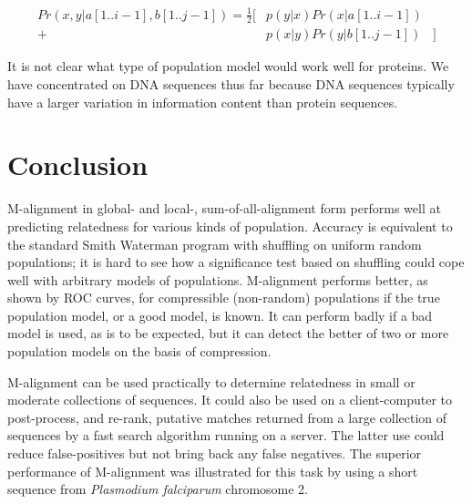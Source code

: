 \documentclass[letterpaper,11pt,oneside]{article}
\begin{document}
\begin{multicols}{2}
{
\small
\setlength{\arraycolsep}{0pt}
\begin{eqnarray*}
Pr(x,y | a[1..i-1],b[1..j-1] ) = \frac{1}{2}
[ & p(y|x) Pr(x | a[1..i-1]) & \\
+ & p(x|y) Pr(y | b[1..j-1]) & ]
\end{eqnarray*}
}

It is not clear what type of population model would work well for proteins.
We have concentrated on DNA sequences thus far because DNA sequences typically
have a larger variation in information content than protein sequences.

\section{Conclusion} \label{sec:conc}

M-alignment in global- and local-, sum-of-all-alignment form performs well
at predicting relatedness for various kinds of population.
Accuracy is equivalent to the standard Smith Waterman program with shuffling
on uniform random populations;
it is hard to see how a significance test based on shuffling could
cope well with arbitrary models of populations.
M-alignment performs better, as shown by ROC curves,
for compressible (non-random) populations if the true
population model, or a good model, is known.
It can perform badly if a bad model is used, as is to be expected,
but it can detect the better of two or more population models
on the basis of compression.

M-alignment can be used practically to determine relatedness
in small or moderate collections of sequences.
It could also be used on a client-computer to post-process, and re-rank,
putative matches returned from a large collection of sequences
by a fast search algorithm running on a server.
The latter use could reduce false-positives but not bring back
any false negatives.  The superior performance of M-alignment was illustrated
for this task by using a short sequence from \emph{Plasmodium
falciparum} chromosome 2.





%




\end{multicols}
\end{document}
